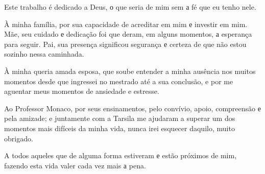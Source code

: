
Este trabalho é dedicado a Deus, о que seria de mim sem а fé que eu tenho nele. 

À minha família, por sua capacidade de acreditar em mim е investir em mim. Mãe, seu cuidado е dedicação foi que deram, em alguns momentos, а esperança para seguir. Pai, sua presença significou segurança е certeza de que não estou sozinho nessa caminhada. 

À minha queria amada esposa, que soube entender a minha ausência nos muitos momentos desde que ingressei no mestrado até a sua conclusão, e por me aguentar meus momentos de ansiedade e estresse. 

Ao Professor Monaco, por seus ensinamentos, pelo convívio, apoio, compreensão е pela amizade; e juntamente com a Tarsila me ajudaram a superar um dos momentos mais difíceis da minha vida, nunca irei esquecer daquilo, muito obrigado.

A todos aqueles que de alguma forma estiveram е estão próximos de mim, fazendo esta vida valer cada vez mais а pena.

